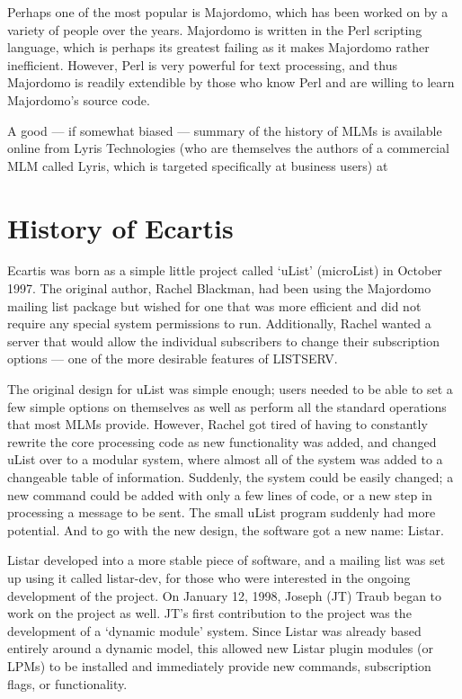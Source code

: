 \documentclass{book}
\begin{document}
Perhaps one of the most popular is Majordomo, which has been
worked on by a variety of people over the years.  Majordomo is written in the
Perl scripting language, which is perhaps its greatest failing as it makes
Majordomo rather inefficient.  However, Perl is very powerful for text
processing, and thus Majordomo is readily extendible by those who know Perl
and are willing to learn Majordomo's source code.
   
A good --- if somewhat biased --- summary of the history of MLMs is available
online from Lyris Technologies (who are themselves the authors of a commercial
MLM called Lyris, which is targeted specifically at business users) at
   
\section{History of Ecartis}
\label{int:history:Ecartis}

Ecartis was born as a simple little project called `uList' (microList) in
October 1997.  The original author, Rachel Blackman, had been using the
Majordomo mailing list package but wished for one that was more efficient and
did not require any special system permissions to run.  Additionally, Rachel
wanted a server that would allow the individual subscribers to change their
subscription options --- one of the more desirable features of LISTSERV.
   
The original design for uList was simple enough; users needed to be able to
set a few simple options on themselves as well as perform all the standard
operations that most MLMs provide.  However, Rachel got tired of having to
constantly rewrite the core processing code as new functionality was added,
and changed uList over to a modular system, where almost all of the system was
added to a changeable table of information.  Suddenly, the system could be
easily changed; a new command could be added with only a few lines of code, or
a new step in processing a message to be sent.  The small uList program
suddenly had more potential.  And to go with the new design, the software got
a new name: Listar.
   
Listar developed into a more stable piece of software, and a mailing list was
set up using it called listar-dev, for those who were interested in the
ongoing development of the project.  On January 12, 1998, Joseph (JT) Traub
began to work on the project as well.  JT's first contribution to the project
was the development of a `dynamic module' system.  Since Listar was already
based entirely around a dynamic model, this allowed new Listar plugin modules
(or LPMs) to be installed and immediately provide new commands, subscription
flags, or functionality.
   
\end{document}

